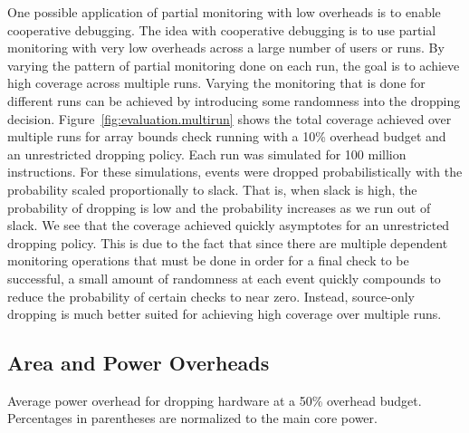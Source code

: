 One possible application of partial monitoring with low overheads is to enable
cooperative debugging. The idea with cooperative debugging is to use partial
monitoring with very low overheads across a large number of users or runs. By
varying the pattern of partial monitoring done on each run, the goal is to
achieve high coverage across multiple runs. Varying the monitoring that is
done for different runs can be achieved by introducing some randomness into the
dropping decision. Figure~\ref{fig:evaluation.multirun} shows the total
coverage achieved over multiple runs for array bounds check running with a 10\%
overhead budget and an unrestricted dropping policy. Each run was simulated for
100 million instructions. For these simulations, events were
dropped probabilistically with the probability scaled proportionally to slack.
That is, when slack is high, the probability of dropping is low and the
probability increases as we run out of slack. We see that the coverage achieved
quickly asymptotes for an unrestricted dropping policy. This is due to the fact
that since there are multiple dependent monitoring operations that must be done
in order for a final check to be successful, a small amount of randomness at
each event quickly compounds to reduce the probability of certain checks to
near zero. Instead, source-only dropping is much better suited for achieving high
coverage over multiple runs.

\subsection{Area and Power Overheads}

\begin{table}[tb]
  \begin{center}
    \vspace{-0.0in}
    \begin{footnotesize}
    
    \end{footnotesize}
    \caption{Average power overhead for dropping hardware at a 50\% overhead
    budget. Percentages in parentheses are normalized to the main core
    power.}
    \vspace{-0.2in}
    \label{tab:evaluation.area_power}
  \end{center}
\end{table}

